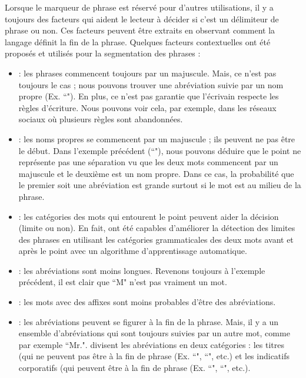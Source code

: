 \documentclass{KodeBook}
\begin{document}
Lorsque le marqueur de phrase est réservé pour d'autres utilisations, il y a toujours des facteurs qui aident le lecteur à décider si c'est un délimiteur de phrase ou non.
Ces facteurs peuvent être extraits en observant comment la langage définit la fin de la phrase. 
Quelques facteurs contextuelles ont été proposés et utilisés pour la segmentation des phrases \cite{10-palmer} :
\begin{itemize}
	\item {} : les phrases commencent toujours par un majuscule. 
	Mais, ce n'est pas toujours le cas ; nous pouvons trouver une abréviation suivie par un nom propre (Ex. ``"). 
	En plus, ce n'est pas garantie que l'écrivain respecte les règles d'écriture. 
	Nous pouvons voir cela, par exemple, dans les réseaux sociaux où plusieurs règles sont abandonnées.
	
	\item {} : les noms propres se commencent par un majuscule ; ils peuvent ne pas être le début.
	Dans l'exemple précédent (``"), nous pouvons déduire que le point ne représente pas une séparation vu que les deux mots commencent par un majuscule et le deuxième est un nom propre. 
	Dans ce cas, la probabilité que le premier soit une abréviation est grande surtout si le mot est au milieu de la phrase.
	
	\item {} : les catégories des mots qui entourent le point peuvent aider la décision (limite ou non). 
	En fait,  \citet{97-palmer-hearst} ont été capables d'améliorer la détection des limites des phrases en utilisant les catégories grammaticales des deux mots avant et après le point avec un algorithme d'apprentissage automatique. 
	
	\item {} : les abréviations sont moins longues.
	Revenons toujours à l'exemple précédent, il est clair que ``M" n'est pas vraiment un mot. 
	
	\item {} : les mots avec des affixes sont moins probables d'être des abréviations.
	
	\item {} : les abréviations peuvent se figurer à la fin de la phrase. 
	Mais, il y a un ensemble d'abréviations qui sont toujours suivies par un autre mot, comme par exemple ``Mr.".
	\citet{89-riley,97-reynar-ratnaparkhi} divisent les abréviations en deux catégories : les titres (qui ne peuvent pas être à la fin de phrase (Ex. ``", ``", etc.) et les indicatifs corporatifs (qui peuvent être à la fin de phrase (Ex. ``", ``", etc.).
\end{itemize}
\end{document}

